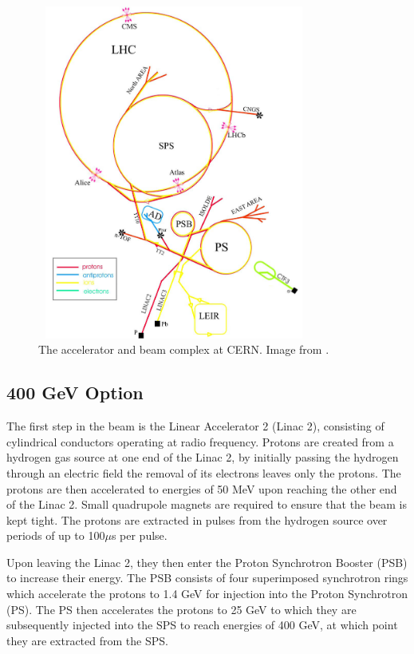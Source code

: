 \begin{figure}[ht]
\begin{center}
\includegraphics[width=90mm,height=110mm]{Chapter2/figures/cernBeamLayout.jpg}
\caption{The accelerator and beam complex at CERN. Image from \cite{cernBeamLayoutPic}.}
\label{fig:cernLayout}
\end{center}
\end{figure}

\subsection{400 GeV Option}
The first step in the beam is the Linear Accelerator 2 (Linac 2), consisting of cylindrical conductors operating at radio frequency. Protons are created from a hydrogen gas source at one end of the Linac 2, by initially passing the hydrogen through an electric field the removal of its electrons leaves only the protons. The protons are then accelerated to energies of 50 MeV upon reaching the other end of the Linac 2. Small quadrupole magnets are required to ensure that the beam is kept tight. The protons are extracted in pulses from the hydrogen source over periods of up to 100$\mu$s per pulse. 

Upon leaving the Linac 2, they then enter the Proton Synchrotron Booster (PSB) to increase their energy. The PSB consists of four superimposed synchrotron rings which accelerate the protons to 1.4 GeV for injection into the Proton Synchrotron (PS). The PS then accelerates the protons to 25 GeV to which they are subsequently injected into the SPS to reach energies of 400 GeV, at which point they are extracted from the SPS.

